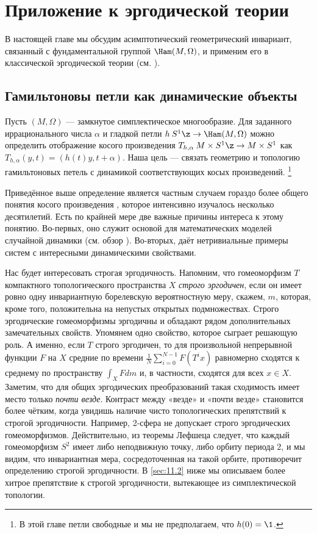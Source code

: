 \chapter[Эргодическая теория]{Приложение к эргодической теории}

В настоящей главе мы обсудим асимптотический геометрический инвариант, связанный с фундаментальной группой $\Ham(M, \Omega)$, и применим его в классической эргодической теории (см. \cite{P9}).

\section{Гамильтоновы петли как динамические объекты}\label{sec:11.1}

Пусть $(M,\Omega)$ --- замкнутое симплектическое многообразие.
Для заданного иррационального числа $\alpha$ и гладкой петли $h \: S^1 \z\to \Ham(M, \Omega)$ можно определить отображение косого произведения $T_{h,\alpha} \: M \times S^1 \z\to M\times S^1$ как $T_{h,\alpha} (y, t) = (h(t)y, t + \alpha)$.
Наша цель --- связать геометрию и топологию гамильтоновых петель с динамикой соответствующих косых произведений.%
\footnote{В этой главе петли свободные и мы не предполагаем, что $h(0) = \1$.}

Приведённое выше определение является частным случаем гораздо более общего понятия косого произведения  \cite[с. 231]{CFS}, которое интенсивно изучалось несколько десятилетий.
Есть по крайней мере две важные причины интереса к этому понятию.
Во-первых, оно служит основой для математических моделей случайной динамики (см. обзор \cite{Ki}).
Во-вторых, даёт нетривиальные примеры систем с интересными динамическими свойствами.

Нас будет интересовать строгая эргодичность.
Напомним, что гомеоморфизм $T$ компактного топологического пространства $X$ \emph{строго эргодичен}, если он имеет ровно одну инвариантную борелевскую вероятностную меру, скажем, $m$, которая, кроме того, положительна на непустых открытых подмножествах.
Строго эргодические гомеоморфизмы эргодичны и обладают рядом дополнительных замечательных свойств.
Упомянем одно свойство, которое сыграет решающую роль.
А именно, если $T$ строго эргодичен, то для произвольной непрерывной функции $F$ на $X$ средние по времени $\tfrac1N\sum_{i=0}^{N-1}F(T^ix)$ равномерно сходятся к среднему по пространству $\int_XFdm$ и, в частности, сходятся для всех $x \in X$.
Заметим, что для общих эргодических преобразований такая сходимость имеет место только \emph{почти везде}.
Контраст между «везде» и «почти везде» становится более чётким, когда увидишь наличие чисто топологических препятствий к строгой эргодичности.
Например, 2-сфера не допускает строго эргодических гомеоморфизмов.
Действительно, из теоремы Лефшеца следует, что каждый гомеоморфизм $S^2$ имеет либо неподвижную точку, либо орбиту периода $2$, и мы видим, что инвариантная мера, сосредоточенная на такой орбите, противоречит определению строгой эргодичности.
В \ref{sec:11.2} ниже мы описываем более хитрое препятствие к строгой эргодичности, вытекающее из симплектической топологии.

